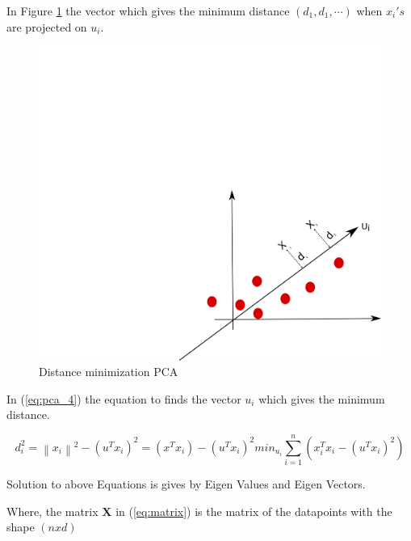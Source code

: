 In Figure \ref{fig:pca_step3} the vector which gives the minimum distance $(d_1,d_1, \cdots)$ when $x_i's$ are projected on $u_i$. 

\begin{figure}[H]
\centering
\includegraphics[scale=0.7]{imagens/pca3.png}
\caption{Distance minimization PCA}
\label{fig:pca_step3}
\end{figure}

In (\ref{eq:pca_4}) the equation to finds the vector $u_i$ which gives the minimum distance. 

\begin{subequations}
    \label{eq:pca_4}
    \begin{equation}
        d_i^2 = \left \| x_i \right \|^2 - \left ( u^Tx_i \right )^2
    \end{equation}
    \begin{equation}
        = \left ( x^Tx_i \right ) - (u^Tx_i)^2
    \end{equation}
    \begin{equation}
        min_{u_i} \sum_{i=1}^{n}\left ( x_i^Tx_i - \left ( u^Tx_i \right )^2 \right )
    \end{equation}
\end{subequations}

Solution to above Equations is gives by Eigen Values and Eigen Vectors. 

Where, the matrix $\mathbf{X}$ in (\ref{eq:matrix}) is the matrix of the datapoints with the shape $(n x d)$

